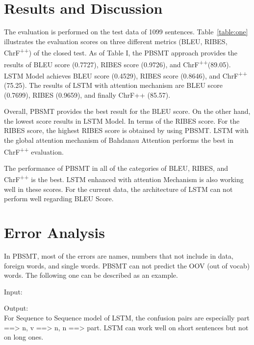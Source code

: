 \documentclass[conference]{IEEEtran}
\begin{document}
\section {Results and Discussion}
\label{sec:ResultsandDiscussion}
The evaluation is performed on the test data of 1099 sentences. Table~\ref{table:one} illustrates the evaluation scores on three different metrics (BLEU, RIBES, ChrF\textsuperscript{++}) of the closed test. As of Table I, the PBSMT approach provides the results of BLEU score (0.7727), RIBES score (0.9726), and ChrF\textsuperscript{++}(89.05). LSTM Model achieves BLEU score (0.4529), RIBES score (0.8646), and ChrF\textsuperscript{++}(75.25). The results of LSTM with attention mechanism are BLEU score (0.7699), RIBES (0.9659), and finally ChrF++ (85.57).

Overall, PBSMT provides the best result for the BLEU score. On the other hand, the lowest score results in LSTM Model. In terms of the RIBES score. For the RIBES score, the highest RIBES score is obtained by using PBSMT. LSTM with the global attention mechanism of Bahdanau Attention performs the best in ChrF\textsuperscript{++} evaluation.

The performance of PBSMT in all of the categories of BLEU, RIBES, and ChrF\textsuperscript{++} is the best. LSTM enhanced with attention Mechanism is also working well in these scores. For the current data, the architecture of LSTM can not perform well regarding BLEU Score.

\section {Error Analysis}
\label{sec:Error Analysis}
In PBSMT, most of the errors are names, numbers that not include in data, foreign words, and single words. PBSMT can not predict the OOV (out of vocab) words. The following one can be described as an example.

\noindent Input:    

\noindent Output:    \\

For Sequence to Sequence model of LSTM, the confusion pairs are especially  part ==> n,   v ==> n,  n ==> part. LSTM can work well on short sentences but not on long ones.
\end{document}
